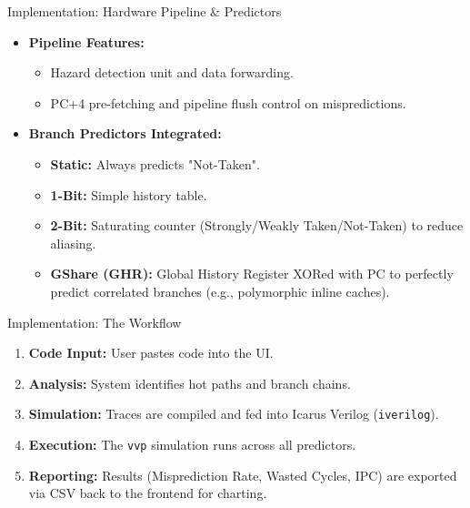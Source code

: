 \documentclass{beamer}
\begin{document}
\begin{frame}{Implementation: Hardware Pipeline \& Predictors}
  \begin{itemize}
    \item \textbf{Pipeline Features:} 
      \begin{itemize}
        \item Hazard detection unit and data forwarding.
        \item PC+4 pre-fetching and pipeline flush control on mispredictions.
      \end{itemize}
    \item \textbf{Branch Predictors Integrated:}
      \begin{itemize}
        \item \textbf{Static:} Always predicts "Not-Taken".
        \item \textbf{1-Bit:} Simple history table.
        \item \textbf{2-Bit:} Saturating counter (Strongly/Weakly Taken/Not-Taken) to reduce aliasing.
        \item \textbf{GShare (GHR):} Global History Register XORed with PC to perfectly predict correlated branches (e.g., polymorphic inline caches).
      \end{itemize}
  \end{itemize}
\end{frame}

\begin{frame}{Implementation: The Workflow}
  \begin{enumerate}
    \item \textbf{Code Input:} User pastes code into the UI.
    \item \textbf{Analysis:} System identifies hot paths and branch chains.
    \item \textbf{Simulation:} Traces are compiled and fed into Icarus Verilog (\texttt{iverilog}).
    \item \textbf{Execution:} The \texttt{vvp} simulation runs across all predictors.
    \item \textbf{Reporting:} Results (Misprediction Rate, Wasted Cycles, IPC) are exported via CSV back to the frontend for charting.
  \end{enumerate}
\end{frame}
\end{document}
